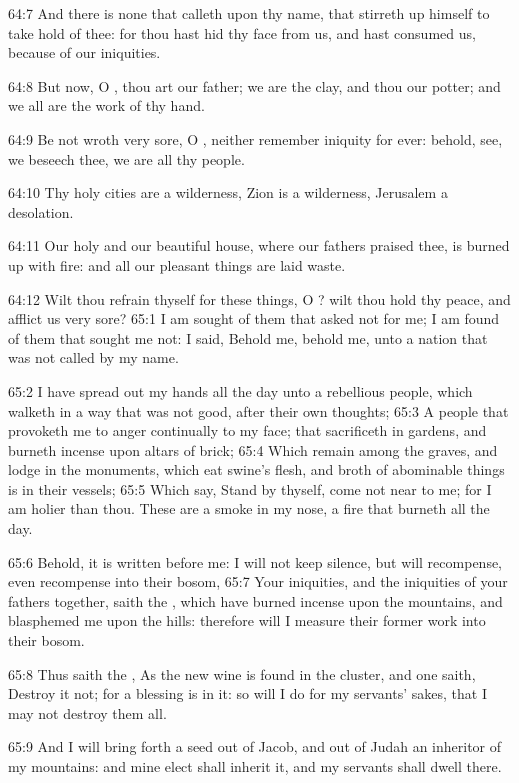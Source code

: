 64:7 And there is none that calleth upon thy name, that stirreth up himself to take hold of thee: for thou hast hid thy face from us, and hast consumed us, because of our iniquities.

64:8 But now, O \LORD, thou art our father; we are the clay, and thou our potter; and we all are the work of thy hand.

64:9 Be not wroth very sore, O \LORD, neither remember iniquity for ever: behold, see, we beseech thee, we are all thy people.

64:10 Thy holy cities are a wilderness, Zion is a wilderness, Jerusalem a desolation.

64:11 Our holy and our beautiful house, where our fathers praised thee, is burned up with fire: and all our pleasant things are laid waste.

64:12 Wilt thou refrain thyself for these things, O \LORD? wilt thou hold thy peace, and afflict us very sore?  65:1 I am sought of them that asked not for me; I am found of them that sought me not: I said, Behold me, behold me, unto a nation that was not called by my name.

65:2 I have spread out my hands all the day unto a rebellious people, which walketh in a way that was not good, after their own thoughts; 65:3 A people that provoketh me to anger continually to my face; that sacrificeth in gardens, and burneth incense upon altars of brick; 65:4 Which remain among the graves, and lodge in the monuments, which eat swine's flesh, and broth of abominable things is in their vessels; 65:5 Which say, Stand by thyself, come not near to me; for I am holier than thou. These are a smoke in my nose, a fire that burneth all the day.

65:6 Behold, it is written before me: I will not keep silence, but will recompense, even recompense into their bosom, 65:7 Your iniquities, and the iniquities of your fathers together, saith the \LORD, which have burned incense upon the mountains, and blasphemed me upon the hills: therefore will I measure their former work into their bosom.

65:8 Thus saith the \LORD, As the new wine is found in the cluster, and one saith, Destroy it not; for a blessing is in it: so will I do for my servants' sakes, that I may not destroy them all.

65:9 And I will bring forth a seed out of Jacob, and out of Judah an inheritor of my mountains: and mine elect shall inherit it, and my servants shall dwell there.

